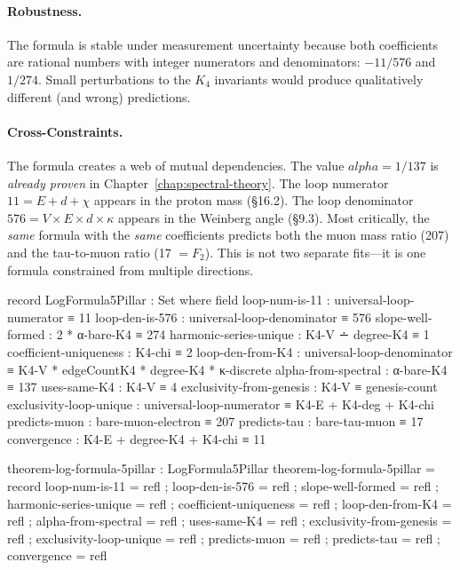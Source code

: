 \documentclass[11pt,a4paper]{book}
\def\alpha{alpha}%
\begin{document}
\paragraph{Robustness.} The formula is stable under measurement uncertainty because both coefficients are rational numbers with integer numerators and denominators: $-11/576$ and $1/274$. Small perturbations to the $K_4$ invariants would produce qualitatively different (and wrong) predictions.

\paragraph{Cross-Constraints.} The formula creates a web of mutual dependencies. The value $\alpha = 1/137$ is \emph{already proven} in Chapter~\ref{chap:spectral-theory}. The loop numerator $11 = E + d + \chi$ appears in the proton mass (\S 16.2). The loop denominator $576 = V \times E \times d \times \kappa$ appears in the Weinberg angle (\S 9.3). Most critically, the \emph{same} formula with the \emph{same} coefficients predicts both the muon mass ratio (207) and the tau-to-muon ratio (17 $= F_2$). This is not two separate fits---it is one formula constrained from multiple directions.

\begin{code}
record LogFormula5Pillar : Set where
  field
    loop-num-is-11         : universal-loop-numerator ≡ 11
    loop-den-is-576        : universal-loop-denominator ≡ 576
    slope-well-formed      : 2 * α-bare-K4 ≡ 274
    harmonic-series-unique : K4-V ∸ degree-K4 ≡ 1
    coefficient-uniqueness : K4-chi ≡ 2
    loop-den-from-K4       : universal-loop-denominator ≡ K4-V * edgeCountK4 * degree-K4 * κ-discrete
    alpha-from-spectral    : α-bare-K4 ≡ 137
    uses-same-K4           : K4-V ≡ 4
    exclusivity-from-genesis : K4-V ≡ genesis-count
    exclusivity-loop-unique  : universal-loop-numerator ≡ K4-E + K4-deg + K4-chi
    predicts-muon          : bare-muon-electron ≡ 207
    predicts-tau           : bare-tau-muon ≡ 17
    convergence            : K4-E + degree-K4 + K4-chi ≡ 11

theorem-log-formula-5pillar : LogFormula5Pillar
theorem-log-formula-5pillar = record
  { loop-num-is-11         = refl
  ; loop-den-is-576        = refl
  ; slope-well-formed      = refl
  ; harmonic-series-unique = refl
  ; coefficient-uniqueness = refl
  ; loop-den-from-K4       = refl
  ; alpha-from-spectral    = refl
  ; uses-same-K4           = refl
  ; exclusivity-from-genesis = refl
  ; exclusivity-loop-unique = refl
  ; predicts-muon          = refl
  ; predicts-tau           = refl
  ; convergence            = refl
  }
\end{code}
\end{document}
